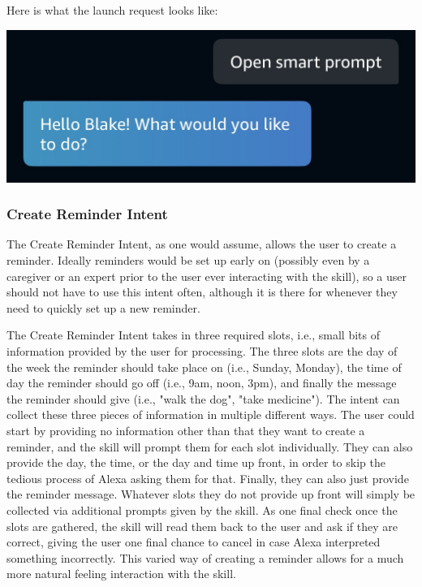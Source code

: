 \documentclass[11pt, oneside]{article}
\begin{document}
Here is what the launch request looks like:
\begin{center}
  \includegraphics[width=\linewidth * 3/4]{images/launchRequest.jpg}
\end{center}

\subsubsection{Create Reminder Intent}

The Create Reminder Intent, as one would assume, allows the user to create a reminder. 
Ideally reminders would be set up early on (possibly even by a caregiver or an expert prior to the user ever interacting with the skill), so a user should not have to use this intent often, although it is there for whenever they need to quickly set up a new reminder. 

The Create Reminder Intent takes in three required slots, i.e., small bits of information provided by the user for processing. 
The three slots are the day of the week the reminder should take place on (i.e., Sunday, Monday), the time of day the reminder should go off (i.e., 9am, noon, 3pm), and finally the message the reminder should give (i.e., "walk the dog", "take medicine").
The intent can collect these three pieces of information in multiple different ways. 
The user could start by providing no information other than that they want to create a reminder, and the skill will prompt them for each slot individually. 
They can also provide the day, the time, or the day and time up front, in order to skip the tedious process of Alexa asking them for that. 
Finally, they can also just provide the reminder message. 
Whatever slots they do not provide up front will simply be collected via additional prompts given by the skill. 
As one final check once the slots are gathered, the skill will read them back to the user and ask if they are correct, giving the user one final chance to cancel in case Alexa interpreted something incorrectly. 
This varied way of creating a reminder allows for a much more natural feeling interaction with the skill. 
\end{document}
